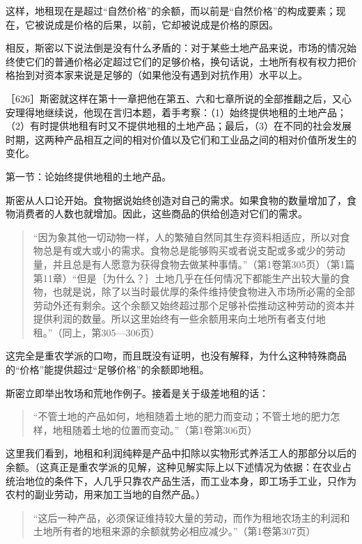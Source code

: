 这样，地租现在是超过“自然价格”的余额，而以前是“自然价格”的构成要素；现在，它被说成是价格的后果，以前，它却被说成是价格的原因。

相反，斯密以下说法倒是没有什么矛盾的：对于某些土地产品来说，市场的情况始终使它们的普通价格必定超过它们的足够价格，换句话说，土地所有权有权力把价格抬到对资本家来说是足够的（如果他没有遇到对抗作用）水平以上。

［626］斯密就这样在第十一章把他在第五、六和七章所说的全部推翻之后，又心安理得地继续说，他现在言归本题，着手考察：（1）始终提供地租的土地产品；（2）有时提供地租有时又不提供地租的土地产品；最后，（3）在不同的社会发展时期，这两种产品相互之间的相对价值以及它们和工业品之间的相对价值所发生的变化。


第一节：论始终提供地租的土地产品。

斯密从人口论开始。食物据说始终创造对自己的需求。如果食物的数量增加了，食物消费者的人数也就增加。因此，这些商品的供给创造对它们的需求。

\begin{quote}{“因为象其他一切动物一样，人的繁殖自然同其生存资料相适应，所以对食物总是有或大或小的需求。食物总是能够购买或者说支配或多或少的劳动量，并且总是有人愿意为获得食物去做某种事情。”（第1卷第305页）（第1篇第11章）“但是｛为什么？｝土地几乎在任何情况下都能生产出较大量的食物，也就是说，除了以当时最优厚的条件维持使食物进入市场所必需的全部劳动外还有剩余。这个余额又始终超过那个足够补偿推动这种劳动的资本并提供利润的数量。所以这里始终有一些余额用来向土地所有者支付地租。”（同上，第305—306页）}\end{quote}

这完全是重农学派的口吻，而且既没有证明，也没有解释，为什么这种特殊商品的“价格”能提供超过“足够价格”的余额即地租。

斯密立即举出牧场和荒地作例子。接着是关于级差地租的话：

\begin{quote}{“不管土地的产品如何，地租随着土地的肥力而变动；不管土地的肥力怎样，地租随着土地的位置而变动。”（第1卷第306页）}\end{quote}

这里我们看到，地租和利润纯粹是产品中扣除以实物形式养活工人的那部分以后的余额。（这真正是重农学派的见解，这种见解实际上以下述情况为依据：在农业占统治地位的条件下，人几乎只靠农产品生活，而工业本身，即工场手工业，只作为农村的副业劳动，用来加工当地的自然产品。）

\begin{quote}{“这后一种产品，必须保证维持较大量的劳动，而作为租地农场主的利润和土地所有者的地租来源的余额就势必相应减少。”（第1卷第307页）}\end{quote}

